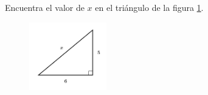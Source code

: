 \question[15]  Encuentra el valor de $x$ en el triángulo de la figura \ref{fig:lados_pitagoras_13}.
\begin{figure}[H]
    \begin{center}
        \includegraphics[width=0.3\textwidth]{../images/lados_pitagoras_13.png}
    \end{center}
    \caption{}
    \label{fig:lados_pitagoras_13}
\end{figure}